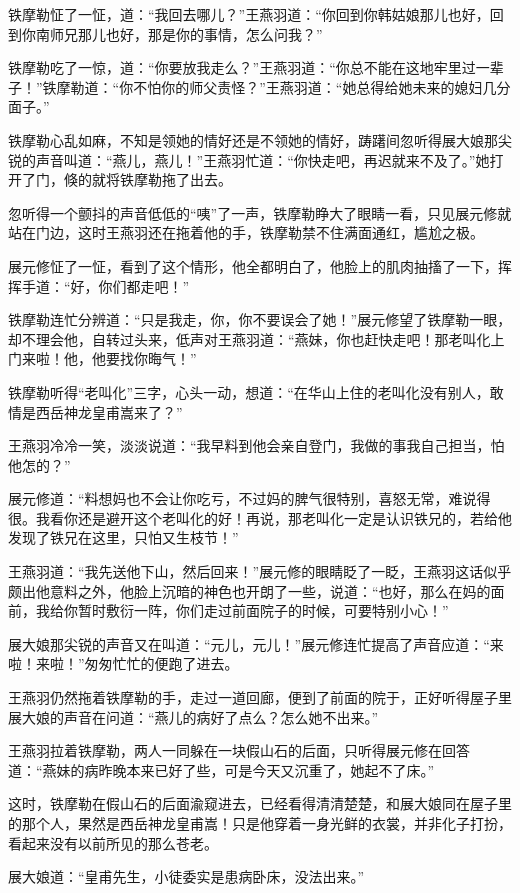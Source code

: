 \documentclass[12pt,oneside]{book}
\begin{document}
铁摩勒怔了一怔，道：``我回去哪儿？''王燕羽道：``你回到你韩姑娘那儿也好，回到你南师兄那儿也好，那是你的事情，怎么问我？''

铁摩勒吃了一惊，道：``你要放我走么？''王燕羽道：``你总不能在这地牢里过一辈子！''铁摩勒道：``你不怕你的师父责怪？''王燕羽道：``她总得给她未来的媳妇几分面子。''

铁摩勒心乱如麻，不知是领她的情好还是不领她的情好，踌躇间忽听得展大娘那尖锐的声音叫道：``燕儿，燕儿！''王燕羽忙道：``你快走吧，再迟就来不及了。''她打开了门，倏的就将铁摩勒拖了出去。

忽听得一个颤抖的声音低低的``咦''了一声，铁摩勒睁大了眼睛一看，只见展元修就站在门边，这时王燕羽还在拖着他的手，铁摩勒禁不住满面通红，尴尬之极。

展元修怔了一怔，看到了这个情形，他全都明白了，他脸上的肌肉抽搐了一下，挥挥手道：``好，你们都走吧！''

铁摩勒连忙分辨道：``只是我走，你，你不要误会了她！''展元修望了铁摩勒一眼，却不理会他，自转过头来，低声对王燕羽道：``燕妹，你也赶快走吧！那老叫化上门来啦！他，他要找你晦气！''

铁摩勒听得``老叫化''三字，心头一动，想道：``在华山上住的老叫化没有别人，敢情是西岳神龙皇甫嵩来了？''

王燕羽冷冷一笑，淡淡说道：``我早料到他会亲自登门，我做的事我自己担当，怕他怎的？''

展元修道：``料想妈也不会让你吃亏，不过妈的脾气很特别，喜怒无常，难说得很。我看你还是避开这个老叫化的好！再说，那老叫化一定是认识铁兄的，若给他发现了铁兄在这里，只怕又生枝节！''

王燕羽道：``我先送他下山，然后回来！''展元修的眼睛眨了一眨，王燕羽这话似乎颇出他意料之外，他脸上沉暗的神色也开朗了一些，说道：``也好，那么在妈的面前，我给你暂时敷衍一阵，你们走过前面院子的时候，可要特别小心！''

展大娘那尖锐的声音又在叫道：``元儿，元儿！''展元修连忙提高了声音应道：``来啦！来啦！''匆匆忙忙的便跑了进去。

王燕羽仍然拖着铁摩勒的手，走过一道回廊，便到了前面的院于，正好听得屋子里展大娘的声音在问道：``燕儿的病好了点么？怎么她不出来。''

王燕羽拉着铁摩勒，两人一同躲在一块假山石的后面，只听得展元修在回答道：``燕妹的病昨晚本来已好了些，可是今天又沉重了，她起不了床。''

这时，铁摩勒在假山石的后面渝窥进去，已经看得清清楚楚，和展大娘同在屋子里的那个人，果然是西岳神龙皇甫嵩！只是他穿着一身光鲜的衣裳，并非化子打扮，看起来没有以前所见的那么苍老。

展大娘道：``皇甫先生，小徒委实是患病卧床，没法出来。''
\end{document}
